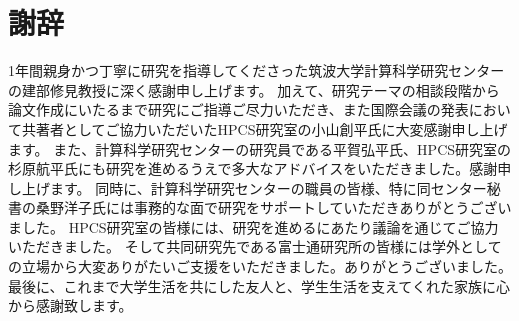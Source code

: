 \documentclass[a4paper,11pt]{jreport}
\begin{document}
\chapter*{謝辞}
1年間親身かつ丁寧に研究を指導してくださった筑波大学計算科学研究センターの建部修見教授に深く感謝申し上げます。
加えて、研究テーマの相談段階から論文作成にいたるまで研究にご指導ご尽力いただき、また国際会議の発表において共著者としてご協力いただいたHPCS研究室の小山創平氏に大変感謝申し上げます。
また、計算科学研究センターの研究員である平賀弘平氏、HPCS研究室の杉原航平氏にも研究を進めるうえで多大なアドバイスをいただきました。感謝申し上げます。
同時に、計算科学研究センターの職員の皆様、特に同センター秘書の桑野洋子氏には事務的な面で研究をサポートしていただきありがとうございました。
HPCS研究室の皆様には、研究を進めるにあたり議論を通じてご協力いただきました。
そして共同研究先である富士通研究所の皆様には学外としての立場から大変ありがたいご支援をいただきました。ありがとうございました。
最後に、これまで大学生活を共にした友人と、学生生活を支えてくれた家族に心から感謝致します。

\newpage

\renewcommand{\bibname}{参考文献}

%
%



\end{document}
